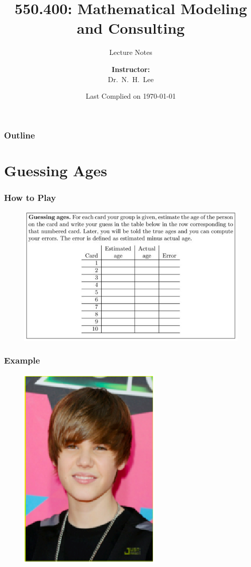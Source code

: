 \documentclass[compress,handout,10pt]{beamer}
\title{{\color{blue} \LARGE 550.400: Mathematical Modeling and Consulting\newline} }
\subtitle{{\color{red} \large Lecture Notes} }
\author{ 
    {\bf{Instructor:}} \\ 
Dr.~N.~H.~Lee \\ 
    \vspace{5pt}
}
\institute{JHU AMS 2013 Spring}
\date{\mygreen Last Complied on \today}
\begin{document}
\begin{frame}[plain]
    \titlepage
\end{frame}

\begin{frame}
    \frametitle{Outline}
    \tableofcontents
\end{frame}

\section{Guessing Ages}
\begin{frame}
    \frametitle{How to Play}
    \vspace{7pt}
    \begin{figure}
        \begin{center}
            \includegraphics[width=\textwidth]{images/guessingagesrule.png}
        \end{center}
    \end{figure}
\end{frame}

\begin{frame}
    \frametitle{Example}
    \vspace{7pt}
    \begin{figure}
        \begin{center}
            \includegraphics[height=0.8\textheight]{images/JustinBieber.png}
        \end{center}
    \end{figure}
\end{frame}
\end{document}
